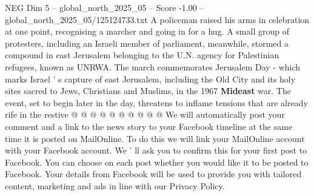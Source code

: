 \begin{textsample}{NEG Dim 5 – global\_north\_2025\_05 – Score -1.00 – global\_north\_2025\_05/125124733.txt}
A policeman raised his arms in celebration at one point, recognising a marcher and going in for a hug.
A small group of protesters, including an Israeli member of parliament, meanwhile, stormed a compound in east Jerusalem belonging to the U.N. agency for Palestinian refugees, known as UNRWA.
The march commemorates Jerusalem Day - which marks Israel ' s capture of east Jerusalem, including the Old City and its holy sites sacred to Jews, Christians and Muslims, in the 1967 \textbf{Mideast} war.
The event, set to begin later in the day, threatens to inflame tensions that are already rife in the restive @ @ @ @ @ @ @ @ @ @ We will automatically post your comment and a link to the news story to your Facebook timeline at the same time it is posted on MailOnline.
To do this we will link your MailOnline account with your Facebook account.
We ' ll ask you to confirm this for your first post to Facebook.
You can choose on each post whether you would like it to be posted to Facebook.
Your details from Facebook will be used to provide you with tailored content, marketing and ads in line with our Privacy Policy.

\end{textsample}
